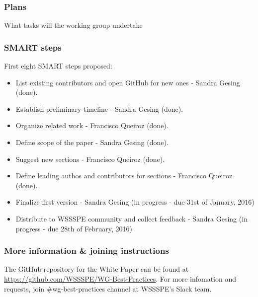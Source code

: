 \subsubsection{Plans}

What tasks will the working group undertake

\subsubsection{SMART steps}

First eight SMART steps proposed: \\
\begin{itemize}
\item List existing contributors and open GitHub for new ones - Sandra Gesing (done). 
\item Establish preliminary timeline  - Sandra Gesing (done). 
\item Organize related work - Francisco Queiroz (done). 
\item Define scope of the paper - Sandra Gesing (done). 
\item Suggest new sections - Francisco Queiroz (done). 
\item Define leading authos and contributors for sections - Francisco Queiroz (done). 
\item Finalize first version - Sandra Gesing (in progress - due 31st of January, 2016) 
\item Distribute to WSSSPE community and collect feedback - Sandra Gesing (in progress - due 28th of February, 2016) 
\end{itemize}

\subsubsection{More information \& joining instructions}

The GitHub repository for the White Paper can be found at \url{https://github.com/WSSSPE/WG-Best-Practices}. For more infomation and requests, join \#wg-best-practices channel at WSSSPE's Slack team.
